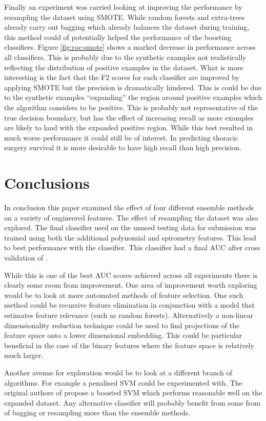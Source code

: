 \documentclass[journal]{IEEEtran}
\begin{document}
Finally an experiment was carried looking at improving the performance by resampling the dataset using SMOTE. While random forests and extra-trees already carry out bagging which already balances the dataset during training, this method could of potentially helped the performance of the boosting classifiers. Figure \ref{fig:roc-smote} shows a marked decrease in performance across all classifiers. This is probably due to the synthetic examples not realistically reflecting the distribution of positive examples in the dataset. What is more interesting is the fact that the F2 scores for each classifier are improved by applying SMOTE but the precision is dramatically hindered. This is could be due to the synthetic examples ``expanding'' the region around positive examples which the algorithm considers to be positive. This is probably not representative of the true decision boundary, but has the effect of increasing recall as more examples are likely to land with the expanded positive region. While this test resulted in much worse performance it could still be of interest. In predicting thoracic surgery survival it is more desirable to have high recall than high precision.


\section{Conclusions}
\label{sec:conclusions}
In conclusion this paper examined the effect of four different ensemble methods on a variety of engineered features. The effect of resampling the dataset was also explored. The final classifier used on the unused testing data for submission was trained using both the additional polynomial and spirometry features. This lead to best performance with the {} classifier. This classifier had a final AUC after cross validation of {}.

While this is one of the best AUC scores achieved across all experiments there is clearly some room from improvement. One area of improvement worth exploring would be to look at more automated methods of feature selection. One such method could be recursive feature elimination in conjunction with a model that estimates feature relevance (such as random forests). Alternatively a non-linear dimensionality reduction technique could be used to find projections of the feature space onto a lower dimensional embedding. This could be particular beneficial in the case of the binary features where the feature space is relatively much larger. 

Another avenue for exploration would be to look at a different branch of algorithms. For example a penalised SVM could be experimented with. The original authors of \cite{zikeba2014boosted} propose a boosted SVM which performs reasonable well on the expanded dataset. Any alternative classifier will probably benefit from some from of bagging or resampling more than the ensemble methods.
\end{document}
